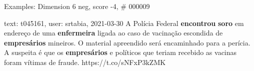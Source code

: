 \begin{frame}{Examples: Dimension 6 neg, score -4, \# 000009}
\footnotesize
\begin{alertblock}{text: t045161, user: srtabia, 2021-03-30}
A Polícia Federal \textbf{encontrou} \textbf{soro} em endereço de uma 
\textbf{enfermeira} ligada ao caso de vacinação escondida de 
\textbf{empresários} mineiros. O material apreendido será encaminhado para a 
perícia. A suspeita é que os \textbf{empresários} e políticos que teriam 
recebido as vacinas foram vítimas de fraude. https://t.co/sNFxP3kZMK 
\end{alertblock}
\end{frame}
